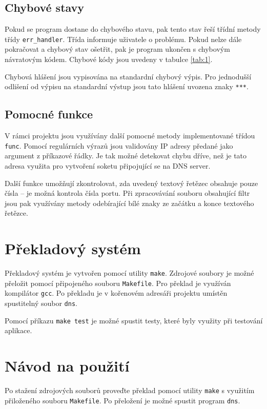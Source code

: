 \documentclass[a4paper, 11pt]{article}
\begin{document}
	\subsection{Chybové stavy}
	Pokud se program dostane do chybového stavu, pak tento stav řeší třídní metody třídy \texttt{err\_handler}. Třída informuje uživatele o problému. Pokud nelze dále pokračovat a chybový stav ošetřit, pak je program ukončen s chybovým návratovým kódem. Chybové kódy jsou uvedeny v tabulce \ref{tab:1}.
	
	Chybová hlášení jsou vypisována na standardní chybový výpis. Pro jednodušší odlišení od výpisu na standardní výstup jsou tato hlášení uvozena znaky \texttt{***}.
	
	\subsection{Pomocné funkce}
	V rámci projektu jsou využívány další pomocné metody implementované třídou \texttt{func}. Pomocí regulárních výrazů jsou validovány IP adresy předané jako argument z příkazové řádky. Je tak možné detekovat chybu dříve, než je tato adresa využita pro vytvoření soketu připojující se na DNS server. 
	
	Další funkce umožňují zkontrolovat, zda uvedený textový řetězec obsahuje pouze čísla -- je možná kontrola čísla portu. Při zpracovávání souboru obsahující filtr jsou pak využívány metody odebírající bílé znaky ze začátku a konce textového řetězce. 
	
	\section{Překladový systém}
	Překladový systém je vytvořen pomocí utility \texttt{make}. Zdrojové soubory je možné přeložit pomocí připojeného souboru \texttt{Makefile}. Pro překlad je využíván kompilátor \texttt{gcc}. Po překladu je v kořenovém adresáři projektu umístěn spustitelný soubor \texttt{dns}.
	
	Pomocí příkazu \texttt{make test} je možné spustit testy, které byly využity při testování aplikace. 
	
	\section{Návod na použití}
	Po stažení zdrojových souborů proveďte překlad pomocí utility \texttt{make} s využitím přiloženého souboru \texttt{Makefile}. Po přeložení je možné spustit program \texttt{dns}.
	
\end{document}
